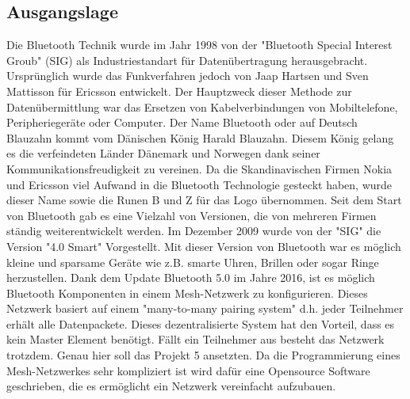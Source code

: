 
\subsection{Ausgangslage}\label{subsec:Ausgangslage}

Die Bluetooth Technik wurde im Jahr 1998 von der "Bluetooth Special Interest Groub" (SIG) als Industriestandart für Datenübertragung herausgebracht. Ursprünglich wurde das Funkverfahren jedoch von Jaap Hartsen und Sven Mattisson für Ericsson entwickelt. Der Hauptzweck dieser Methode zur Datenübermittlung war das Ersetzen von Kabelverbindungen von Mobiltelefone, Peripheriegeräte oder Computer. Der Name Bluetooth oder auf Deutsch Blauzahn kommt vom Dänischen König Harald Blauzahn. Diesem König gelang es die verfeindeten Länder Dänemark und Norwegen dank seiner Kommunikationsfreudigkeit zu vereinen. Da die Skandinavischen Firmen Nokia und Ericsson viel Aufwand in die Bluetooth Technologie gesteckt haben, wurde dieser Name sowie die Runen B und Z für das Logo übernommen. Seit dem Start von Bluetooth gab es eine Vielzahl von Versionen, die von mehreren Firmen ständig weiterentwickelt werden. Im Dezember 2009 wurde von der "SIG" die Version "4.0 Smart" Vorgestellt. Mit dieser Version von Bluetooth war es möglich kleine und sparsame Geräte wie z.B. smarte Uhren, Brillen oder sogar Ringe herzustellen. Dank dem Update Bluetooth 5.0 im Jahre 2016, ist es möglich Bluetooth Komponenten in einem Mesh-Netzwerk zu konfigurieren. Dieses Netzwerk basiert auf einem "many-to-many pairing system" d.h. jeder Teilnehmer erhält alle Datenpackete. Dieses dezentralisierte System hat den Vorteil, dass es kein Master Element benötigt. Fällt ein Teilnehmer aus besteht das Netzwerk trotzdem. Genau hier soll das Projekt 5 ansetzten. Da die Programmierung eines Mesh-Netzwerkes sehr kompliziert ist wird dafür eine Opensource Software geschrieben, die es ermöglicht ein Netzwerk vereinfacht aufzubauen. 








